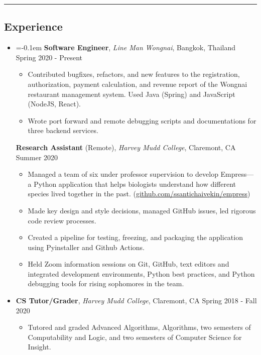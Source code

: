 \documentclass[10pt,letterpaper]{article}
\begin{document}
\hrule
\vspace{-0.95em}
\subsection*{Experience}
  \begin{itemize}
    \item[]
    \parskip=-0.1em
    {\textbf{Software Engineer}, \textit{Line Man Wongnai}, Bangkok, Thailand \hfill {Spring 2020 - Present}}
    \begin{itemize}[label=\textbullet]
      \itemsep0.1em
      \item Contributed bugfixes, refactors, and new features to the registration, authorization, payment calculation, and revenue report of the Wongnai restaurant management system. Used Java (Spring) and JavaScript (NodeJS, React).
      \item Wrote port forward and remote debugging scripts and documentations for three backend services.
    \end{itemize}
    {\textbf{Research Assistant} (Remote), \textit{Harvey Mudd College}, Claremont, CA \hfill {Summer 2020}}
    \begin{itemize}[label=\textbullet]
      \itemsep0.1em
      \item Managed a team of six under professor supervision to develop Empress---a Python application that helps biologists understand how different species lived together in the past. (\href{https://github.com/ssantichaivekin/empress}{github.com/ssantichaivekin/empress})
      \item Made key design and style decisions, managed GitHub issues, led rigorous code review processes.
      \item Created a pipeline for testing, freezing, and packaging the application using Pyinstaller and Github Actions.
      \item Held Zoom information sessions on Git, GitHub, text editors and integrated development environments, Python best practices, and Python debugging tools for rising sophomores in the team.
    \end{itemize}
    \vspace{0.1em}
    \item[]
    {\textbf{CS Tutor/Grader}, \textit{Harvey Mudd College}, Claremont, CA \hfill {Spring 2018 - Fall 2020}}
    \begin{itemize}[label=\textbullet]
      \itemsep0.1em
      \item Tutored and graded Advanced Algorithms, Algorithms, two semesters of Computability and Logic, and two semesters of Computer Science for Insight.

\end{itemize}
\end{itemize}
\end{document}
